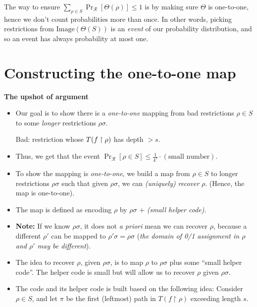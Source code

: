 The way to ensure
$\sum_{\rho \in S} \Pr_{\mathcal{R}}[\Theta(\rho)] \leq 1
$
is by making sure \( \Theta \) is one-to-one, 
hence we don't count probabilities more than once.
In other words, picking restrictions from \(\text{Image}(\Theta(S))\) is an \emph{event} of our probability distribution, and so an event has always probability at most one.

\section*{Constructing the one-to-one map}


\begin{tcolorbox}[colframe=white, colback=blue!4, boxrule=0mm, sharp corners]
\textbf{The upshot of argument}
\begin{itemize}
    \item Our goal is to show there is a \emph{one-to-one} mapping from bad restrictions \( \rho \in S \) to some \emph{longer} restrictions \( \rho\sigma \). 

    Bad: restriction whose \( T(f\upharpoonright\rho) \) has depth \( > s \). 
    \item Thus, we get that the event \( \Pr_{\mathcal{R}}[ \rho \in S ] \leq \frac{1}{4^s} \cdot (\text{small number}) \).
    
    \item To show the mapping is \emph{one-to-one}, we build a map from \( \rho \in S \) to longer restrictions \( \rho\sigma \) such that given \( \rho\sigma \), we can \emph{(uniquely) recover} \( \rho \). (Hence, the map is one-to-one).
    
    \item The map is defined as encoding \( \rho \) by \( \rho\sigma \) + \emph{(small helper code)}.

    \item \textbf{Note:} If we know \( \rho\sigma \), it does not \emph{a priori} mean we can recover \( \rho \), because a different \( \rho' \) can be mapped to \( \rho'\sigma = \rho\sigma \) (\emph{the domain of 0/1 assignment in \( \rho \) and \( \rho' \) may be different}).
    
    \item The idea to recover \( \rho \), given \( \rho\sigma \), is to map \( \rho \) to \( \rho\sigma \) plus some ``small helper code''. The helper code is small but will allow us to recover \( \rho \) given \( \rho\sigma \).

    \item The code and its helper code is built based on the following idea: Consider \( \rho \in S \), and let \( \pi \) be the first (leftmost) path in \( T(f \restriction \rho) \) exceeding length \( s \). 
    

\end{itemize}
\end{tcolorbox}
